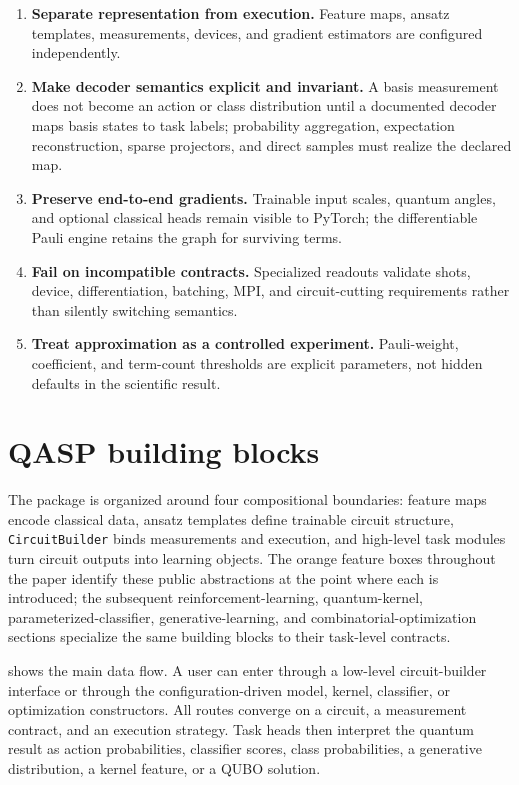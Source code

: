 \documentclass[10pt]{article}
\newcommand{\code}[1]{\texttt{#1}}
\begin{document}
\begin{enumerate}
  \item \textbf{Separate representation from execution.}  Feature maps, ansatz templates, measurements, devices, and gradient estimators are configured independently.
  \item \textbf{Make decoder semantics explicit and invariant.}  A basis
        measurement does not become an action or class distribution until a
        documented decoder maps basis states to task labels; probability
        aggregation, expectation reconstruction, sparse projectors, and direct
        samples must realize the declared map.
  \item \textbf{Preserve end-to-end gradients.}  Trainable input scales, quantum angles, and optional classical heads remain visible to PyTorch; the differentiable Pauli engine retains the graph for surviving terms.
  \item \textbf{Fail on incompatible contracts.}  Specialized readouts validate
        shots, device, differentiation, batching, MPI, and circuit-cutting
        requirements rather than silently switching semantics.
  \item \textbf{Treat approximation as a controlled experiment.}  Pauli-weight, coefficient, and term-count thresholds are explicit parameters, not hidden defaults in the scientific result.
\end{enumerate}

\section{QASP building blocks}
\label{sec:architecture}

The package is organized around four compositional boundaries: feature maps
encode classical data, ansatz templates define trainable circuit structure,
\code{CircuitBuilder} binds measurements and execution, and high-level task
modules turn circuit outputs into learning objects.  The orange feature boxes
throughout the paper identify these public abstractions at the point where each
is introduced; the subsequent reinforcement-learning, quantum-kernel,
parameterized-classifier, generative-learning, and combinatorial-optimization
sections specialize the same building blocks to their task-level contracts.

 shows the main data flow.  A user can enter through a
low-level circuit-builder interface or through the configuration-driven model,
kernel, classifier, or optimization constructors.  All routes converge on a circuit, a
measurement contract, and an execution strategy.  Task heads then interpret
the quantum result as action probabilities, classifier scores, class
probabilities, a generative distribution, a kernel feature, or a QUBO solution.
\end{document}
